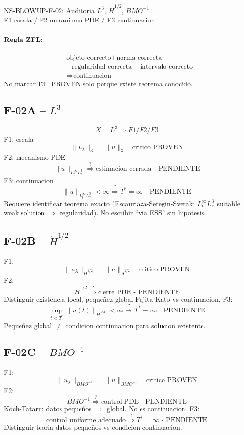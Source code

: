 \documentclass[11pt]{article}
\begin{document}
\begin{center}
{\Large NS-BLOWUP-F-02: Auditoria $L^3$, $\dot H^{1/2}$, $BMO^{-1}$}\\
F1 escala / F2 mecanismo PDE / F3 continuacion
\end{center}

\paragraph{Regla ZFL:}
\[
\boxed{
\begin{aligned}
&\text{objeto correcto}+\text{norma correcta}\\
&+\text{regularidad correcta}+\text{intervalo correcto}\\
&\Rightarrow\text{continuacion}
\end{aligned}}
\]
No marcar F3=PROVEN solo porque existe teorema conocido.

\subsection*{F-02A -- $L^3$}
\[
\boxed{X=L^3\Rightarrow F1/F2/F3}
\]
F1: escala
\[
\|u_\lambda\|_3=\|u\|_3\quad\text{critico PROVEN}
\]
F2: mecanismo PDE
\[
\|u\|_{L^\infty_tL^3_x}\stackrel{?}{\Rightarrow}\text{estimacion cerrada - PENDIENTE}
\]
F3: continuacion
\[
\|u\|_{L^\infty_tL^3_x}<\infty\stackrel{?}{\Rightarrow}T^*=\infty\text{ - PENDIENTE}
\]
Requiere identificar teorema exacto (Escauriaza-Seregin-Sverak: $L^\infty_tL^3_x$ suitable weak solution $ \Rightarrow$ regularidad). No escribir ``via ESS'' sin hipotesis.

\subsection*{F-02B -- $\dot H^{1/2}$}
F1:
\[
\|u_\lambda\|_{\dot H^{1/2}}=\|u\|_{\dot H^{1/2}}\quad\text{critico PROVEN}
\]
F2:
\[
\dot H^{1/2}\stackrel{?}{\Rightarrow}\text{cierre PDE - PENDIENTE}
\]
Distinguir existencia local, peque\~nez global Fujita-Kato vs continuacion.
F3:
\[
\sup_{t<T^*}\|u(t)\|_{\dot H^{1/2}}<\infty\stackrel{?}{\Rightarrow}T^*=\infty\text{ - PENDIENTE}
\]
Peque\~nez global $\neq$ condicion continuacion para solucion existente.

\subsection*{F-02C -- $BMO^{-1}$}
F1:
\[
\|u_\lambda\|_{BMO^{-1}}=\|u\|_{BMO^{-1}}\quad\text{critico PROVEN}
\]
F2:
\[
BMO^{-1}\stackrel{?}{\Rightarrow}\text{control PDE - PENDIENTE}
\]
Koch-Tataru: datos peque\~nos $\Rightarrow$ global. No es continuacion.
F3:
\[
\text{control uniforme adecuado}\stackrel{?}{\Rightarrow}T^*=\infty\text{ - PENDIENTE}
\]
Distinguir teoria datos peque\~nos vs condicion continuacion.
\end{document}
